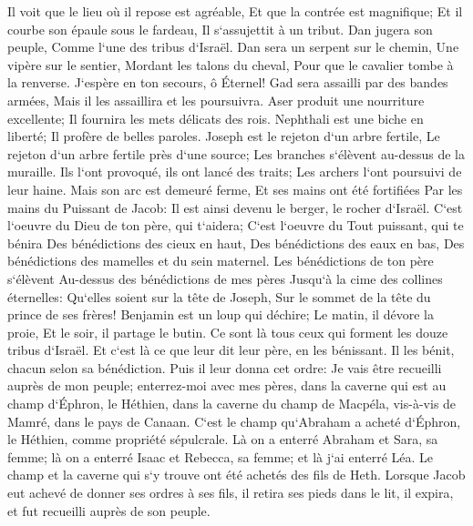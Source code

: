 \verse Il voit que le lieu où il repose est agréable, Et que la contrée est magnifique; Et il courbe son épaule sous le fardeau, Il s`assujettit à un tribut. 
\verse Dan jugera son peuple, Comme l`une des tribus d`Israël. 
\verse Dan sera un serpent sur le chemin, Une vipère sur le sentier, Mordant les talons du cheval, Pour que le cavalier tombe à la renverse. 
\verse J`espère en ton secours, ô Éternel! 
\verse Gad sera assailli par des bandes armées, Mais il les assaillira et les poursuivra. 
\verse Aser produit une nourriture excellente; Il fournira les mets délicats des rois. 
\verse Nephthali est une biche en liberté; Il profère de belles paroles. 
\verse Joseph est le rejeton d`un arbre fertile, Le rejeton d`un arbre fertile près d`une source; Les branches s`élèvent au-dessus de la muraille. 
\verse Ils l`ont provoqué, ils ont lancé des traits; Les archers l`ont poursuivi de leur haine. 
\verse Mais son arc est demeuré ferme, Et ses mains ont été fortifiées Par les mains du Puissant de Jacob: Il est ainsi devenu le berger, le rocher d`Israël. 
\verse C`est l`oeuvre du Dieu de ton père, qui t`aidera; C`est l`oeuvre du Tout puissant, qui te bénira Des bénédictions des cieux en haut, Des bénédictions des eaux en bas, Des bénédictions des mamelles et du sein maternel. 
\verse Les bénédictions de ton père s`élèvent Au-dessus des bénédictions de mes pères Jusqu`à la cime des collines éternelles: Qu`elles soient sur la tête de Joseph, Sur le sommet de la tête du prince de ses frères! 
\verse Benjamin est un loup qui déchire; Le matin, il dévore la proie, Et le soir, il partage le butin. 
\verse Ce sont là tous ceux qui forment les douze tribus d`Israël. Et c`est là ce que leur dit leur père, en les bénissant. Il les bénit, chacun selon sa bénédiction. 
\verse Puis il leur donna cet ordre: Je vais être recueilli auprès de mon peuple; enterrez-moi avec mes pères, dans la caverne qui est au champ d`Éphron, le Héthien, 
\verse dans la caverne du champ de Macpéla, vis-à-vis de Mamré, dans le pays de Canaan. C`est le champ qu`Abraham a acheté d`Éphron, le Héthien, comme propriété sépulcrale. 
\verse Là on a enterré Abraham et Sara, sa femme; là on a enterré Isaac et Rebecca, sa femme; et là j`ai enterré Léa. 
\verse Le champ et la caverne qui s`y trouve ont été achetés des fils de Heth. 
\verse Lorsque Jacob eut achevé de donner ses ordres à ses fils, il retira ses pieds dans le lit, il expira, et fut recueilli auprès de son peuple. 


